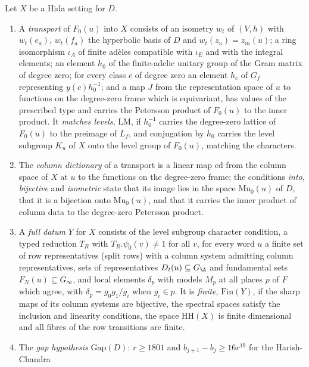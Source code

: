 \begin{definition}\label{pf:baselat1:def:transport}
Let $X$ be a Hida setting for $D$.
\begin{enumerate}[label=(\alph*)]
\item A \emph{transport} of $F_0(u)$ into $X$ consists of an isometry $w_t$ of $(V,h)$ with $w_t(e_a)$, $w_t(f_a)$ the
  hyperbolic basis of $D$ and $w_t(z_u)=z_m(u)$; a ring isomorphism $\iota_A$ of finite ad\`eles compatible with
  $\iota_E$ and with the integral elements; an element $h_0$ of the finite-adelic unitary group of the Gram matrix of
  degree zero; for every class $c$ of degree zero an element $h_c$ of $G_f$ representing $y(c)h_0^{-1}$; and a map $J$
  from the representation space of $u$ to functions on the degree-zero frame which is equivariant, has values of the
  prescribed type and carries the Petersson product of $F_0(u)$ to the inner product. It \emph{matches levels},
  $\mathrm{LM}$, if $h_0^{-1}$ carries the degree-zero lattice of $F_0(u)$ to the preimage of $L_f$, and conjugation by $h_0$
  carries the level subgroup $K_u$ of $X$ onto the level group of $F_0(u)$, matching the characters.
\item The \emph{column dictionary} of a transport is a linear map $\mathrm{cd}$ from the column space of $X$ at $u$ to the
  functions on the degree-zero frame; the conditions \emph{into}, \emph{bijective} and \emph{isometric} state that its
  image lies in the space $\mathrm{Mu}_0(u)$ of $D$, that it is a bijection onto $\mathrm{Mu}_0(u)$, and that it carries the
  inner product of column data to the degree-zero Petersson product.
\item A \emph{full datum} $Y$ for $X$ consists of the level subgroup character condition, a typed reduction $T_R$ with
  $T_R.\psi_0(v)\ne1$ for all $v$, for every word $u$ a finite set of row representatives (split rows) with a column
  system admitting column representatives, sets of representatives $D_t(u)\subseteq G_{\A}$ and fundamental sets
  $F_N(u)\subseteq G_\infty$, and local elements $\delta_p$ with models $M_p$ at all places $p$ of $F$ which agree, with
  $\delta_p=g_0g_1/g_i$ when $g_i\in p$. It is \emph{finite}, $\mathrm{Fin}(Y)$, if the sharp maps of its column systems
  are bijective, the spectral spaces satisfy the inclusion and linearity conditions, the space $\mathrm{HH}(X)$
  is finite dimensional and all fibres of the row transitions are finite.
\item The \emph{gap hypothesis} $\mathrm{Gap}(D)$: $r\ge1801$ and $b_{j+1}-b_j\ge16r^{19}$ for the Harish-Chandra

\end{enumerate}
\end{definition}
